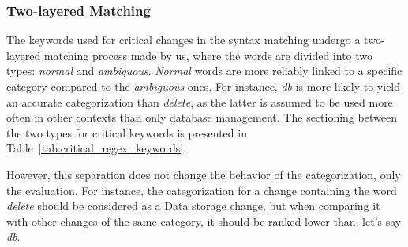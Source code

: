 \subsubsection{Two-layered Matching}
\label{sec:two_layered_matching}
The keywords used for critical changes in the syntax matching undergo a two-layered matching process made by us, where the words are divided into two types: \textit{normal} and \textit{ambiguous}. \textit{Normal} words are more reliably linked to a specific category compared to the \textit{ambiguous} ones. For instance, \textit{db} is more likely to yield an accurate categorization than \textit{delete}, as the latter is assumed to be used more often in other contexts than only database management. The sectioning between the two types for critical keywords is presented in  Table~\ref{tab:critical_regex_keywords}.

However, this separation does not change the behavior of the categorization, only the evaluation. For instance, the categorization for a change containing the word \textit {delete} should be considered as a Data storage change, but when comparing it with other changes of the same category, it should be ranked lower than, let's say \textit{db}.


